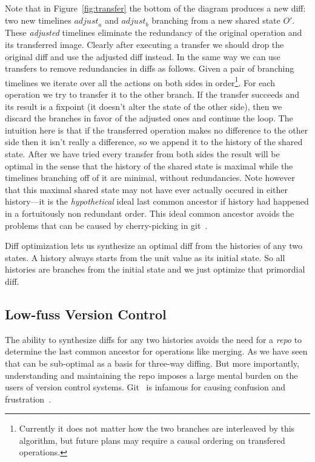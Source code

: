 \documentclass[english,submission]{programming}
\theoremstyle{definition}
\begin{document}
Note that in Figure~\ref{fig:transfer} the bottom of the diagram produces a new diff: two new timelines $\mathit{adjust}_a$ and $\mathit{adjust}_b$ branching from a new shared state $O'$. These \textit{adjusted} timelines eliminate the redundancy of the original operation and its transferred image. Clearly after executing a transfer we should drop the original diff and use the adjusted diff instead. In the same way we can use transfers to remove redundancies in diffs as follows. Given a pair of branching timelines we iterate over all the actions on both sides in order\footnote{Currently it does not matter how the two branches are interleaved by this algorithm, but future plans may require a causal ordering on transfered operations.}. For each operation we try to transfer it to the other branch. If the transfer succeeds and its result is a fixpoint (it doesn't alter the state of the other side), then we discard the branches in favor of the adjusted ones and continue the loop. The intuition here is that if the transferred operation makes no difference to the other side then it isn't really a difference, so we append it to the history of the shared state. After we have tried every transfer from both sides the result will be optimal in the sense that the history of the shared state is maximal while the timelines branching off of it are minimal, without redundancies. Note however that this maximal shared state may not have ever actually occured in either history---it is the \textit{hypothetical} ideal last common ancestor if history had happened in a fortuitously non redundant order. This ideal common ancestor avoids the problems that can be caused by cherry-picking in git~\cite{philomatics-git}.

Diff optimization lets us synthesize an optimal diff from the histories of any two states. A history always starts from the unit value as its initial state. So all histories are branches from the initial state and we just optimize that primordial diff.

\subsection{Low-fuss Version Control}

The ability to synthesize diffs for any two histories avoids the need for a \textit{repo} to determine the last common ancestor for operations like merging. As we have seen that can be sub-optimal as a basis for three-way diffing. But more importantly, understanding and maintaining the repo imposes a large mental burden on the users of version control systems. Git~\cite{ProGit} is infamous for causing confusion and frustration~\cite{perez13, church2014case, xkcd1597}.
\end{document}
